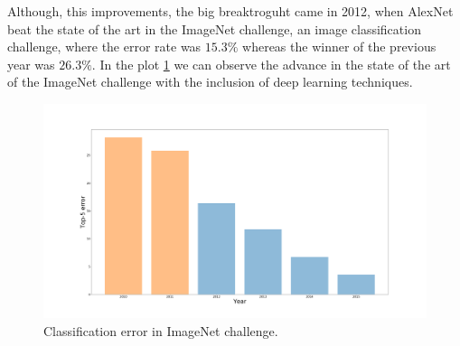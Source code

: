 \documentclass[12pt, a4paper, titlepage,twoside,openright]{article}
\begin{document}



%
%
%



Although, this improvements, the big breaktroguht came in 2012, when AlexNet \cite{alexnet} beat the state of the art in the ImageNet challenge, an image classification challenge, where the error rate was $15.3 \%$ whereas the winner of the previous year was $26.3 \%$. In the plot \ref{intro2} we can observe the advance in the state of the art of the ImageNet challenge with the inclusion of deep learning techniques.




\begin{figure}[H]
\centering         
\includegraphics[width=0.7\linewidth]{intro/iamgeWihtou.png}
\caption{Classification error in ImageNet challenge.} \label{intro2}
\end{figure}
\end{document}
